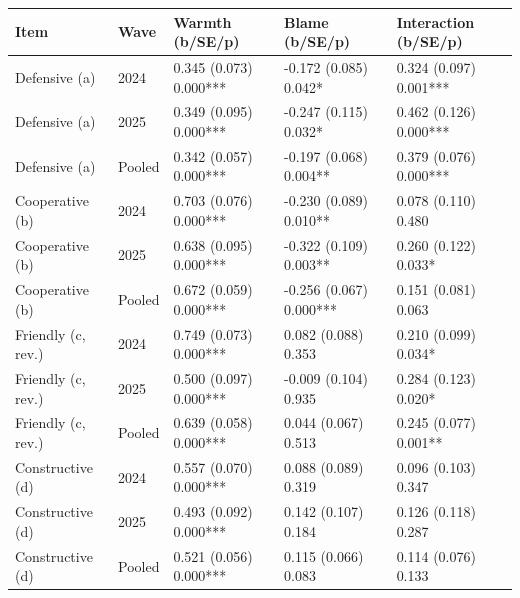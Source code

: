 
\begin{tabular}[t]{lllll}
\toprule
Item & Wave & Warmth (b/SE/p) & Blame (b/SE/p) & Interaction (b/SE/p)\\
\midrule
Defensive (a) & 2024 & 0.345 (0.073) 0.000*** & -0.172 (0.085) 0.042* & 0.324 (0.097) 0.001***\\
Defensive (a) & 2025 & 0.349 (0.095) 0.000*** & -0.247 (0.115) 0.032* & 0.462 (0.126) 0.000***\\
Defensive (a) & Pooled & 0.342 (0.057) 0.000*** & -0.197 (0.068) 0.004** & 0.379 (0.076) 0.000***\\
Cooperative (b) & 2024 & 0.703 (0.076) 0.000*** & -0.230 (0.089) 0.010** & 0.078 (0.110) 0.480\\
Cooperative (b) & 2025 & 0.638 (0.095) 0.000*** & -0.322 (0.109) 0.003** & 0.260 (0.122) 0.033*\\
Cooperative (b) & Pooled & 0.672 (0.059) 0.000*** & -0.256 (0.067) 0.000*** & 0.151 (0.081) 0.063\\
Friendly (c, rev.) & 2024 & 0.749 (0.073) 0.000*** & 0.082 (0.088) 0.353 & 0.210 (0.099) 0.034*\\
Friendly (c, rev.) & 2025 & 0.500 (0.097) 0.000*** & -0.009 (0.104) 0.935 & 0.284 (0.123) 0.020*\\
Friendly (c, rev.) & Pooled & 0.639 (0.058) 0.000*** & 0.044 (0.067) 0.513 & 0.245 (0.077) 0.001**\\
Constructive (d) & 2024 & 0.557 (0.070) 0.000*** & 0.088 (0.089) 0.319 & 0.096 (0.103) 0.347\\
Constructive (d) & 2025 & 0.493 (0.092) 0.000*** & 0.142 (0.107) 0.184 & 0.126 (0.118) 0.287\\
Constructive (d) & Pooled & 0.521 (0.056) 0.000*** & 0.115 (0.066) 0.083 & 0.114 (0.076) 0.133\\
\bottomrule
\end{tabular}
